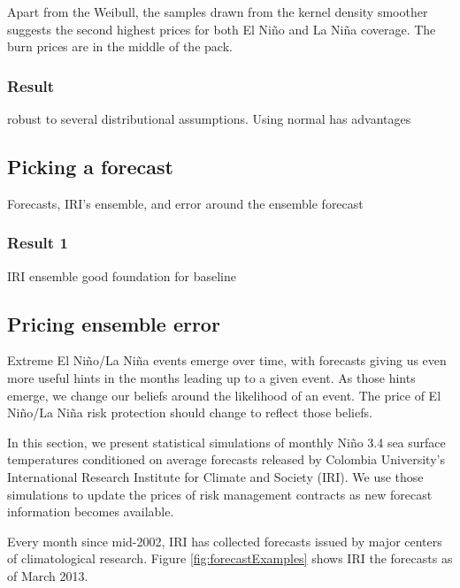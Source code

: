 \documentclass[authoryear]{article}
\begin{document}
Apart from the Weibull, the samples drawn from the kernel density smoother suggests the second highest prices for both El Ni\~no and La Ni\~na coverage. The burn prices are in the middle of the pack.
\subsubsection{Result}
robust to several distributional assumptions. 
Using normal has advantages

\subsection{Picking a forecast}
Forecasts, IRI’s ensemble, and error around the ensemble forecast
\subsubsection{Result 1}
IRI ensemble good foundation for baseline

\subsection{Pricing ensemble error}

Extreme El Ni\~no/La Ni\~na events emerge over time, with forecasts giving us even more useful hints in the months leading up to a given event. As those hints emerge, we change our beliefs around the likelihood of an event. The price of El Ni\~no/La Ni\~na risk protection should change to reflect those beliefs.

In this section, we present statistical simulations of monthly Ni\~no 3.4 sea surface temperatures conditioned on average forecasts released by Colombia University's International Research Institute for Climate and Society (IRI). We use those simulations to update the prices of risk management contracts as new forecast information becomes available.

Every month since mid-2002, IRI has collected forecasts issued by major centers of climatological research. Figure \ref{fig:forecastExamples} shows IRI the forecasts as of March 2013.
\end{document}
